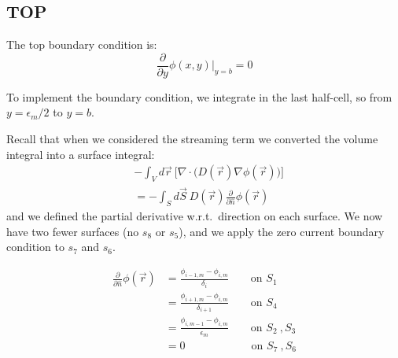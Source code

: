 \documentclass[12pt]{article}
\begin{document}
\newpage
\subsection*{TOP}
The top boundary condition is:
\[\frac{\partial }{\partial y} \phi(x,y)\big|_{y=b} = 0\]


To implement the boundary condition, we integrate in the last half-cell, so from $y=\epsilon_m / 2$ to $y=b$. 

Recall that when we considered the streaming term we converted the volume integral into a surface integral: 
\begin{align}
&-\int_V d\vec{r}\:\bigl[\nabla \cdot \bigl(D(\vec{r})\nabla \phi(\vec{r})\bigr)\bigr] \nonumber \\
 &= -\int_S d\vec{S} \:D(\vec{r})\frac{\partial}{\partial \hat{n}}\phi(\vec{r}) \nonumber
\end{align}
%
and we defined the partial derivative w.r.t.\ direction on each surface. We now have two fewer surfaces (no $s_8$ or $s_5$), and we apply the zero current boundary condition to $s_7$ and $s_6$.


\begin{align}
\frac{\partial}{\partial \hat{n}}\phi(\vec{r}) &= \frac{\phi_{i-1,m} - \phi_{i,m}}{\delta_{i}} \qquad \text{on } S_1  \nonumber \\
%
&= \frac{\phi_{i+1,m} - \phi_{i,m}}{\delta_{i+1}} \qquad \text{on } S_4 \nonumber \\
%
&= \frac{\phi_{i,m-1} - \phi_{i,m}}{\epsilon_m} \qquad \text{on } S_2 \:, S_3 \nonumber \\
%
&= 0 \qquad \qquad \qquad \text{on } S_7 \:, S_6 \nonumber 
\end{align}
\end{document}
